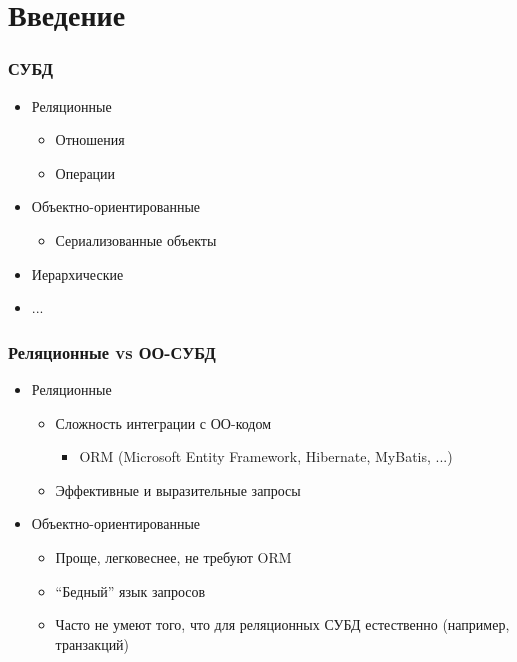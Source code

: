 \documentclass{../../slides-style}
\begin{document}
    \begin{frame}[plain]
        \titlepage
    \end{frame}

    \section{Введение}

    \begin{frame}
        \frametitle{СУБД}
        \begin{itemize}
            \item Реляционные
            \begin{itemize}
                \item Отношения
                \item Операции
            \end{itemize}
            \item Объектно-ориентированные
            \begin{itemize}
                \item Сериализованные объекты
            \end{itemize}
            \item Иерархические
            \item ...
        \end{itemize}
    \end{frame}

    \begin{frame}
        \frametitle{Реляционные vs ОО-СУБД}
        \begin{itemize}
            \item Реляционные
            \begin{itemize}
                \item Сложность интеграции с ОО-кодом
                \begin{itemize}
                    \item ORM (Microsoft Entity Framework, Hibernate, MyBatis, ...)
                \end{itemize}
                \item Эффективные и выразительные запросы
            \end{itemize}
            \item Объектно-ориентированные
            \begin{itemize}
                \item Проще, легковеснее, не требуют ORM
                \item ``Бедный'' язык запросов
                \item Часто не умеют того, что для реляционных СУБД естественно (например, транзакций)
            \end{itemize}
        \end{itemize}
    \end{frame}
\end{document}
